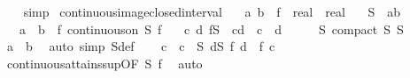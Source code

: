 \begin{isabellebody}
\ \ \isamarkupfalse%
\isanewline
{}\isamarkupfalse%
\ simp%
\endisatagproof
{\isafoldproof}%
%
\isadelimproof
\isanewline
%
\endisadelimproof
\isanewline
\isanewline
{}\isamarkupfalse%
\ continuous{\isacharunderscore}{\kern0pt}image{\isacharunderscore}{\kern0pt}closed{\isacharunderscore}{\kern0pt}interval{\isacharcolon}{\kern0pt}\isanewline
\ \ \ a\ b\ \ f\ {\isacharcolon}{\kern0pt}{\isacharcolon}{\kern0pt}\ {\isachardoublequoteopen}real\ {\isasymRightarrow}\ real{\isachardoublequoteclose}\isanewline
\ \ \ {\isachardoublequoteopen}S\ {\isasymequiv}\ {\isacharbraceleft}{\kern0pt}a{\isachardot}{\kern0pt}{\isachardot}{\kern0pt}b{\isacharbraceright}{\kern0pt}{\isachardoublequoteclose}\isanewline
\ \ \ {\isachardoublequoteopen}a\ {\isasymle}\ b{\isachardoublequoteclose}\ \ f{\isacharcolon}{\kern0pt}\ {\isachardoublequoteopen}continuous{\isacharunderscore}{\kern0pt}on\ S\ f{\isachardoublequoteclose}\isanewline
\ \ \ {\isachardoublequoteopen}{\isasymexists}c\ d{\isachardot}{\kern0pt}\ f{\isacharbackquote}{\kern0pt}S\ {\isacharequal}{\kern0pt}\ {\isacharbraceleft}{\kern0pt}c{\isachardot}{\kern0pt}{\isachardot}{\kern0pt}d{\isacharbraceright}{\kern0pt}\ {\isasymand}\ c\ {\isasymle}\ d{\isachardoublequoteclose}\isanewline
%
\isadelimproof
%
\endisadelimproof
%
\isatagproof
{}\isamarkupfalse%
\ {\isacharminus}{\kern0pt}\isanewline
\ \ \isamarkupfalse%
\ S{\isacharcolon}{\kern0pt}\ {\isachardoublequoteopen}compact\ S{\isachardoublequoteclose}\ {\isachardoublequoteopen}S\ {\isasymnoteq}\ {\isacharbraceleft}{\kern0pt}{\isacharbraceright}{\kern0pt}{\isachardoublequoteclose}\isanewline
\ \ \ \ \isamarkupfalse%
\ {\isacartoucheopen}a\ {\isasymle}\ b{\isacartoucheclose}\ \isamarkupfalse%
\ {\isacharparenleft}{\kern0pt}auto\ simp{\isacharcolon}{\kern0pt}\ S{\isacharunderscore}{\kern0pt}def{\isacharparenright}{\kern0pt}\isanewline
\ \ \isamarkupfalse%
\ c\ \ {\isachardoublequoteopen}c\ {\isasymin}\ S{\isachardoublequoteclose}\ {\isachardoublequoteopen}{\isasymforall}d{\isasymin}S{\isachardot}{\kern0pt}\ f\ d\ {\isasymle}\ f\ c{\isachardoublequoteclose}\isanewline
\ \ \ \ \isamarkupfalse%
\ continuous{\isacharunderscore}{\kern0pt}attains{\isacharunderscore}{\kern0pt}sup{\isacharbrackleft}{\kern0pt}OF\ S\ f{\isacharbrackright}{\kern0pt}\ \isamarkupfalse%
\ auto\isanewline
\ \ \isamarkupfalse%

\end{isabellebody}
